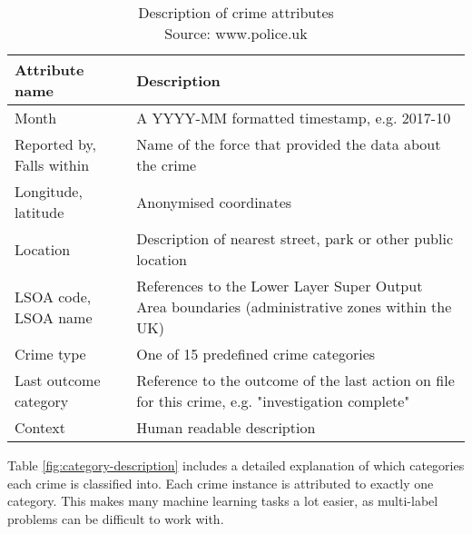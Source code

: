 \documentclass{article}
\begin{document}
	\begin{longtable}{p{2.2cm}p{7.8cm}}
		\caption{Description of crime attributes \\ Source: www.police.uk}
		\label{fig:field-description} \\
		\hline
		{\bf Attribute name} & {\bf Description} \\ \hline
		\endhead
		Month & A YYYY-MM formatted timestamp, e.g. 2017-10 \\ \hline
		Reported by, Falls within & Name of the force that provided the data about the crime \\ \hline
		Longitude, latitude & Anonymised coordinates \\ \hline
		Location & Description of nearest street, park or other public location \\ \hline
		LSOA code, LSOA name & References to the Lower Layer Super Output Area boundaries (administrative zones within the UK) \\ \hline
		Crime type & One of 15 predefined crime categories \\ \hline
		Last outcome category & Reference to the outcome of the last action on file for this crime, e.g. "investigation complete" \\ \hline
		Context & Human readable description \\ \hline
	\end{longtable}

	Table \ref{fig:category-description} includes a detailed explanation of which categories each crime is classified into. Each crime instance is attributed to exactly one category. This makes many machine learning tasks a lot easier, as multi-label problems can be difficult to work with.
\end{document}
